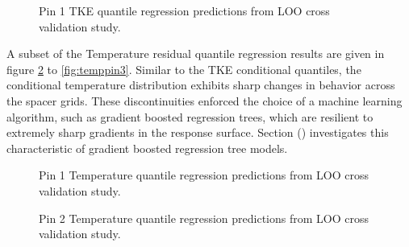 \begin{figure}[H]%
    \centering
    \qquad
    \caption[Q-Q LOO TKE pin 3 results.]{Pin 1 TKE quantile regression predictions from LOO cross validation study.}%
    \label{fig:tkepin3}%
\end{figure}


A subset of the Temperature residual quantile regression results are given in figure \ref{fig:temppin1} to \ref{fig:temppin3}.  Similar to the TKE conditional quantiles, the conditional temperature distribution exhibits sharp changes in behavior across the spacer grids.  These discontinuities enforced the choice of a machine learning algorithm, such as gradient boosted regression trees, which are resilient to extremely sharp gradients in the response surface.  Section () investigates this characteristic of gradient boosted regression tree models.

\begin{figure}[H]%
    \centering
    \qquad
    \caption[Q-Q LOO Temperature pin 1 results.]{Pin 1 Temperature quantile regression predictions from LOO cross validation study.}%
    \label{fig:temppin1}%
\end{figure}

\begin{figure}[H]%
    \centering
    \qquad
    \caption[Q-Q LOO Temperature pin 2 results.]{Pin 2 Temperature quantile regression predictions from LOO cross validation study.}%
    \label{fig:temppin2}%
\end{figure}

